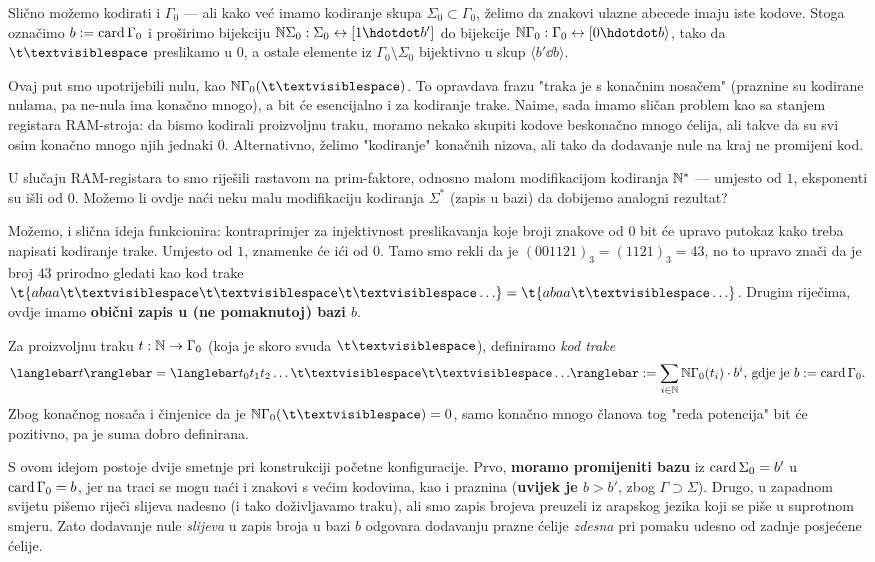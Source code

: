 Slično možemo kodirati i $\Gamma_0$ --- ali kako već imamo kodiranje skupa $\Sigma_0\subset\Gamma_0$, želimo da znakovi ulazne abecede imaju iste kodove. Stoga označimo $b:=\operatorname{card}\Gamma_0$ i proširimo bijekciju $\N\Sigma_0:\Sigma_0\leftrightarrow[1\dd b']$ do bijekcije $\N\Gamma_0:\Gamma_0\leftrightarrow[0\dd b\rangle$, tako da $\bl$ preslikamo u $0$, a ostale elemente iz $\Gamma_0\!\setminus\Sigma_0$ bijektivno u skup $\langle b'\dd b\rangle$.

Ovaj put smo upotrijebili nulu, kao $\N\Gamma_0(\bl)$. To opravdava frazu "traka je s konačnim nosačem" (praznine su kodirane nulama, pa ne-nula ima konačno mnogo), a bit će esencijalno i za kodiranje trake. Naime, sada imamo sličan problem kao sa stanjem registara RAM-stroja: da bismo kodirali proizvoljnu traku, moramo nekako skupiti kodove beskonačno mnogo ćelija, ali takve da su svi osim konačno mnogo njih jednaki $0$. Alternativno, želimo "kodiranje" konačnih nizova, ali tako da dodavanje nule na kraj ne promijeni kod.

U slučaju RAM-registara to smo riješili rastavom na prim-faktore, odnosno malom modifikacijom kodiranja ${\mathbb N}^*$ --- umjesto od $1$, eksponenti su išli od $0$. Možemo li ovdje naći neku malu modifikaciju kodiranja $\Sigma^*$ (zapis u bazi) da dobijemo analogni rezultat?

Možemo, i slična ideja funkcionira: kontraprimjer za injektivnost preslikavanja koje broji znakove od $0$ bit će upravo putokaz kako treba napisati kodiranje trake. Umjesto od $1$, znamenke će ići od $0$. Tamo smo rekli da je $(001121)_3=(1121)_3=43$, no to upravo znači da je broj $43$ prirodno gledati kao kod trake $\t{abaa\bl\bl\bl\ldots}=\t{abaa\bl\ldots}$. Drugim riječima, ovdje imamo \textbf{obični zapis u (ne pomaknutoj$\mspace{1mu}$) bazi $b$}.

\begin{definicija}[{name=[kodiranje trake Turingovog stroja]}]
Za proizvoljnu traku $t:{\mathbb N}\to\Gamma_0$ (koja je skoro svuda $\bl$), definiramo \emph{kod trake} \begin{equation}
	\knk{t}=\knk{t_0t_1t_2\ldots\bl\bl\ldots}:=\sum_{i\in\N}\N\Gamma_0(t_i)\cdot b^i\text{, gdje je $b:=\card\Gamma_0$.}
\end{equation}
	Zbog konačnog nosača i činjenice da je $\N\Gamma_0(\mspace{0.5mu}\bl)=0$, samo konačno mnogo članova tog "reda potencija" bit će pozitivno, pa je suma dobro definirana.
\end{definicija}

S ovom idejom postoje dvije smetnje pri konstrukciji početne konfiguracije. Prvo, \textbf{moramo promijeniti bazu} iz $\operatorname{card}\Sigma_0=b'$ u $\operatorname{card}\Gamma_0=b$, jer na traci se mogu naći i znakovi s većim kodovima, kao i praznina (\textbf{uvijek je $b>b'$}, zbog $\Gamma\supset\Sigma$). Drugo, u zapadnom svijetu pišemo riječi slijeva nadesno (i tako doživljavamo traku), ali smo zapis brojeva preuzeli iz arapskog jezika koji se piše u suprotnom smjeru. Zato dodavanje nule \emph{slijeva} u zapis broja u bazi $b$ odgovara dodavanju prazne ćelije \emph{zdesna} pri pomaku udesno od zadnje posjećene ćelije.

